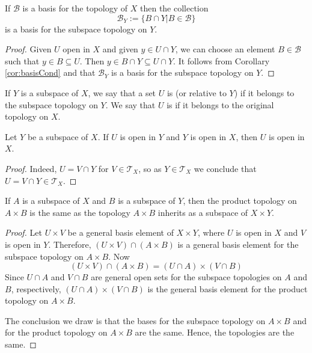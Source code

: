 \documentclass[12pt, a4paper, oneside, openright, titlepage]{book}
\begin{document}
\begin{lemma}
    If $\mathcal{B}$ is a basis for the topology of $X$ then the collection \begin{equation*}
        \mathcal{B}_Y := \{B\cap Y\vert B \in \mathcal{B}\}
    \end{equation*}
    is a basis for the subspace topology on $Y$.
\end{lemma}
\begin{proof}
    Given $U$ open in $X$ and given $y \in U\cap Y$, we can choose an element $B \in \mathcal{B}$ such that $y \in B\subseteq U$. Then $y \in B\cap Y \subseteq U\cap Y$. It follows from Corollary \ref{cor:basisCond} and that $\mathcal{B}_Y$ is a basis for the subspace topology on $Y$. 
\end{proof}


\begin{definition}
    If $Y$ is a subspace of $X$, we say that a set $U$ is  (or relative to $Y$) if it belongs to the subspace topology on $Y$. We say that $U$ is  if it belongs to the original topology on $X$.
\end{definition}


\begin{lemma}
    Let $Y$ be a subspace of $X$. If $U$ is open in $Y$ and $Y$ is open in $X$, then $U$ is open in $X$.
\end{lemma}
\begin{proof}
    Indeed, $U = V\cap Y$ for $V \in \mathcal{T}_X$, so as $Y \in \mathcal{T}_X$ we conclude that $U = V\cap Y \in \mathcal{T}_X$.
\end{proof}

\begin{theorem}
    If $A$ is a subspace of $X$ and $B$ is a subspace of $Y$, then the product topology on $A\times B$ is the same as the topology $A\times B$ inherits as a subspace of $X\times Y$.
\end{theorem}
\begin{proof}
    Let $U\times V$ be a general basis element of $X\times Y$, where $U$ is open in $X$ and $V$ is open in $Y$. Therefore, $(U\times V)\cap(A\times B)$ is a general basis element for the subspace topology on $A\times B$. Now \begin{equation*}
        (U\times V)\cap (A\times B) = (U\cap A)\times (V\cap B)
    \end{equation*}
    Since $U\cap A$ and $V\cap B$ are general open sets for the subspace topologies on $A$ and $B$, respectively, $(U\cap A)\times (V\cap B)$ is the general basis element for the product topology on $A\times B$.

    The conclusion we draw is that the bases for the subspace topology on $A\times B$ and for the product topology on $A\times B$ are the same. Hence, the topologies are the same.
\end{proof}
\end{document}
